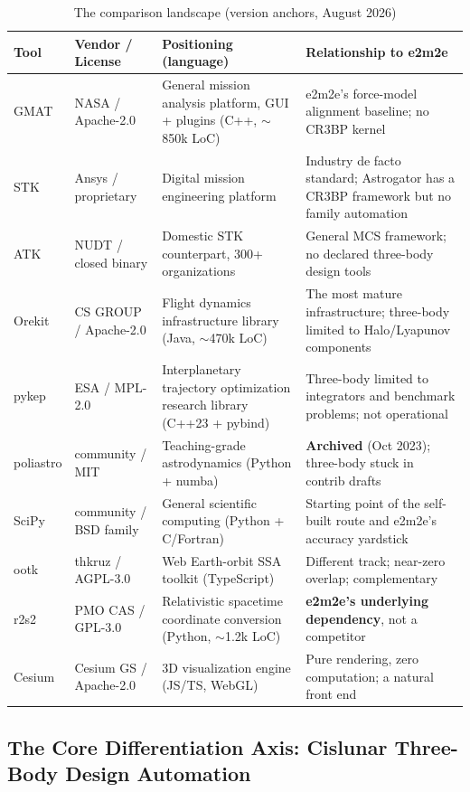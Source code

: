 \begin{table}[htbp]
\centering\footnotesize
\caption{The comparison landscape (version anchors, August 2026)}
\label{tab:landscape}
\begin{tabularx}{\textwidth}{@{}llXX@{}}
\toprule
\textbf{Tool} & \textbf{Vendor / License} &
\textbf{Positioning (language)} & \textbf{Relationship to e2m2e} \\
\midrule
GMAT & NASA / Apache-2.0 & General mission analysis platform, GUI + plugins
(C++, $\sim$850k LoC) & e2m2e's force-model alignment baseline; no CR3BP
kernel \\
STK & Ansys / proprietary & Digital mission engineering platform &
Industry de facto standard; Astrogator has a CR3BP framework but no family
automation \\
ATK & NUDT / closed binary & Domestic STK counterpart, 300+ organizations &
General MCS framework; no declared three-body design tools \\
Orekit & CS GROUP / Apache-2.0 & Flight dynamics infrastructure library
(Java, $\sim$470k LoC) & The most mature infrastructure; three-body limited
to Halo/Lyapunov components \\
pykep & ESA / MPL-2.0 & Interplanetary trajectory optimization research
library (C++23 + pybind) & Three-body limited to integrators and benchmark
problems; not operational \\
poliastro & community / MIT & Teaching-grade astrodynamics (Python + numba) &
\textbf{Archived} (Oct 2023); three-body stuck in contrib drafts \\
SciPy & community / BSD family & General scientific computing (Python +
C/Fortran) & Starting point of the self-built route and e2m2e's accuracy
yardstick \\
ootk & thkruz / AGPL-3.0 & Web Earth-orbit SSA toolkit (TypeScript) &
Different track; near-zero overlap; complementary \\
r2s2 & PMO CAS / GPL-3.0 & Relativistic spacetime coordinate conversion
(Python, $\sim$1.2k LoC) & \textbf{e2m2e's underlying dependency}, not a
competitor \\
Cesium & Cesium GS / Apache-2.0 & 3D visualization engine (JS/TS, WebGL) &
Pure rendering, zero computation; a natural front end \\
\bottomrule
\end{tabularx}
\end{table}

\subsection{The Core Differentiation Axis: Cislunar Three-Body Design
Automation}
\label{subsec:three-body-axis}

